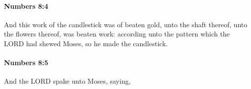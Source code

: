 		\paragraph{Numbers 8:4} %
			\label{NUMBERS-8-4}

			And this work of the candlestick was of beaten gold, unto the shaft thereof, unto the flowers thereof, was beaten work: according unto the pattern which the LORD had shewed Moses, so he made the candlestick.


		\paragraph{Numbers 8:5} %
			\label{NUMBERS-8-5}

			And the LORD spake unto Moses, saying,


